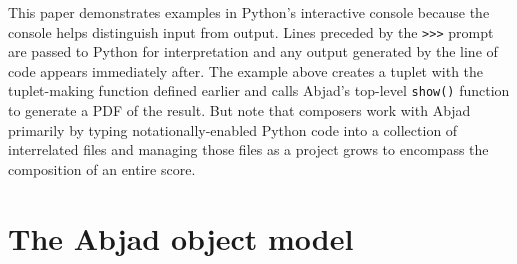 \documentclass{article}
\begin{document}
\noindent This paper demonstrates examples in Python's interactive console
because the console helps distinguish input from output. Lines
preceded by the \texttt{>>>} prompt are passed to Python for interpretation and any output generated by the line of code appears immediately after. The example
above creates a tuplet with the tuplet-making function defined earlier and
calls Abjad's top-level \texttt{show()} function to generate a PDF of the
result. But note that composers work with Abjad primarily by typing
notationally-enabled Python code into a collection of interrelated files and
managing those files as a project grows to encompass the composition of an
entire score.


\section{The Abjad object model} \label{sec:object-model}
\end{document}
